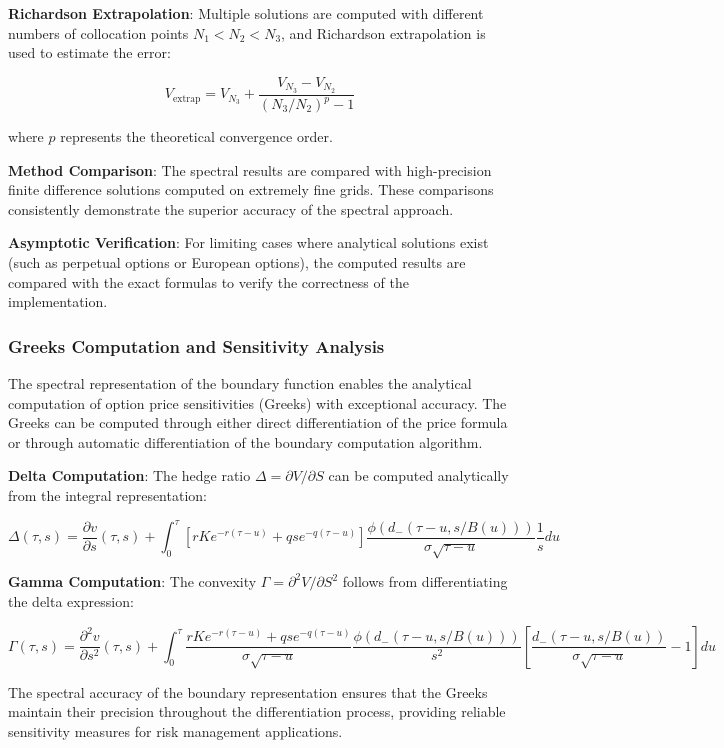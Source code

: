 \documentclass[
  11pt,
  11pt,
  letterpaper,
  onecolumn]{article}
\begin{document}
\textbf{Richardson Extrapolation}: Multiple solutions are computed with
different numbers of collocation points \(N_1 < N_2 < N_3\), and
Richardson extrapolation is used to estimate the error:

\[V_{\text{extrap}} = V_{N_3} + \frac{V_{N_3} - V_{N_2}}{(N_3/N_2)^p - 1} \tag{7.5}\]

where \(p\) represents the theoretical convergence order.

\textbf{Method Comparison}: The spectral results are compared with
high-precision finite difference solutions computed on extremely fine
grids. These comparisons consistently demonstrate the superior accuracy
of the spectral approach.

\textbf{Asymptotic Verification}: For limiting cases where analytical
solutions exist (such as perpetual options or European options), the
computed results are compared with the exact formulas to verify the
correctness of the implementation.

\subsubsection{Greeks Computation and Sensitivity
Analysis}\label{greeks-computation-and-sensitivity-analysis}

The spectral representation of the boundary function enables the
analytical computation of option price sensitivities (Greeks) with
exceptional accuracy. The Greeks can be computed through either direct
differentiation of the price formula or through automatic
differentiation of the boundary computation algorithm.

\textbf{Delta Computation}: The hedge ratio
\(\Delta = \partial V/\partial S\) can be computed analytically from the
integral representation:

\[\Delta(\tau,s) = \frac{\partial v}{\partial s}(\tau,s) + \int_0^\tau \left[rK e^{-r(\tau-u)} + qs e^{-q(\tau-u)}\right] \frac{\phi(d_-(\tau-u,s/B(u)))}{\sigma\sqrt{\tau-u}} \frac{1}{s} du \tag{7.6}\]

\textbf{Gamma Computation}: The convexity
\(\Gamma = \partial^2 V/\partial S^2\) follows from differentiating the
delta expression:

\[\Gamma(\tau,s) = \frac{\partial^2 v}{\partial s^2}(\tau,s) + \int_0^\tau \frac{rK e^{-r(\tau-u)} + qs e^{-q(\tau-u)}}{\sigma\sqrt{\tau-u}} \frac{\phi(d_-(\tau-u,s/B(u)))}{s^2} \left[\frac{d_-(\tau-u,s/B(u))}{\sigma\sqrt{\tau-u}} - 1\right] du \tag{7.7}\]

The spectral accuracy of the boundary representation ensures that the
Greeks maintain their precision throughout the differentiation process,
providing reliable sensitivity measures for risk management
applications.
\end{document}
